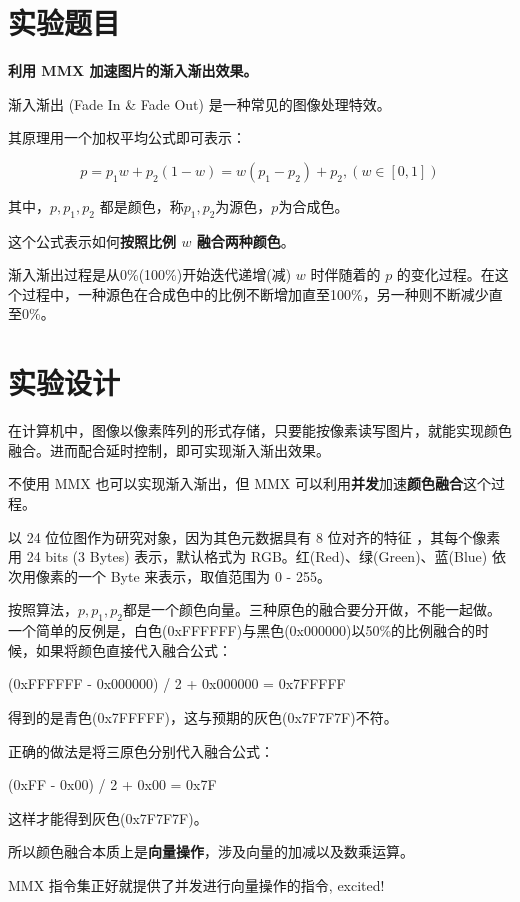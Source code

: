\section{实验题目}

\textbf{利用 MMX \footnotemark 加速图片的渐入渐出效果。}


渐入渐出 (Fade In \& Fade Out) 是一种常见的图像处理特效。

其原理用一个加权平均公式即可表示：

\begin{equation} \label{eq:1}
p = p_1 w + p_2 (1 - w) = w(p_1 - p_2) + p_2 ,( w \in [0, 1] )
\end{equation}

其中，$p, p_1, p_2$ 都是颜色，称$p_1, p_2$为源色，$p$为合成色。

这个公式表示如何\textbf{按照比例 $w$ 融合两种颜色}。

渐入渐出过程是从0\%(100\%)开始迭代递增(减) $w$ 时伴随着的 $p$ 的变化过程。在这个过程中，一种源色在合成色中的比例不断增加直至100\%，另一种则不断减少直至0\%。

\section{实验设计}

在计算机中，图像以像素阵列的形式存储，只要能按像素读写图片，就能实现颜色融合。进而配合延时控制，即可实现渐入渐出效果。

不使用 MMX 也可以实现渐入渐出，但 MMX 可以利用\textbf{并发}加速\textbf{颜色融合}这个过程。

以 24 位位图作为研究对象，因为其色元数据具有 8 位对齐的特征 \footnotemark ，其每个像素用 24 bits (3 Bytes) 表示，默认格式为 RGB。红(Red)、绿(Green)、蓝(Blue) 依次用像素的一个 Byte 来表示，取值范围为 0 - 255。


按照算法，$p, p_1, p_2$都是一个颜色向量。三种原色的融合要分开做，不能一起做。一个简单的反例是，白色(0xFFFFFF)与黑色(0x000000)以50\%的比例融合的时候，如果将颜色直接代入融合公式：

(0xFFFFFF - 0x000000) / 2 + 0x000000 = 0x7FFFFF

得到的是青色(0x7FFFFF)，这与预期的灰色(0x7F7F7F)不符。

正确的做法是将三原色分别代入融合公式：


(0xFF - 0x00) / 2 + 0x00 = 0x7F


这样才能得到灰色(0x7F7F7F)。

所以颜色融合本质上是\textbf{向量操作}，涉及向量的加减以及数乘运算。

MMX 指令集正好就提供了并发进行向量操作的指令, excited!
